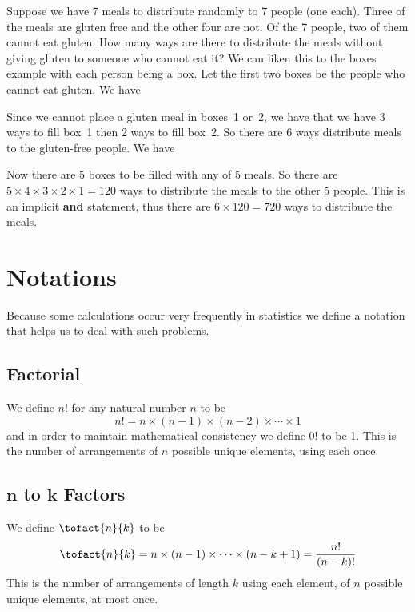 \begin{example}
Suppose we have 7 meals to distribute randomly to 7 people (one each). Three of the meals are gluten free and the other four are not. Of the 7 people, two of them cannot eat gluten. How many ways are there to distribute the meals without giving gluten to someone who cannot eat it?
\tcblower
We can liken this to the boxes example with each person being a box. Let the first two boxes be the people who cannot eat gluten. We have
\begin{center}
\end{center}
Since we cannot place a gluten meal in boxes~1 or~2, we have that we have 3 ways to fill box~1 then 2 ways to fill box~2. So there are 6 ways distribute meals to the gluten-free people. We have
\begin{center}
\end{center}
Now there are 5 boxes to be filled with any of 5 meals. So there are $5 \times 4 \times 3 \times 2 \times 1 = 120$ ways to distribute the meals to the other 5 people. This is an implicit \textbf{and} statement, thus there are $6 \times 120 = 720$ ways to distribute the meals.
\end{example}
\section{Notations}
Because some calculations occur very frequently in statistics we define a notation that helps us to deal with such problems.
\subsection*{Factorial}
We define $n!$ for any natural number $n$ to be
\[
    n! = n \times (n-1) \times (n-2) \times \cdots \times 1
\]
and in order to maintain mathematical consistency we define $0!$ to be 1. This is the number of arrangements of $n$ possible unique elements, using each once.
\subsection*{$\mathbf{n}$ to $\mathbf{k}$ Factors}
We define $\tofact{n}{k}$ to be
\[
    \tofact{n}{k} = n \times (n-1) \times \cdots \times (n-k+1) = \frac{n!}{(n-k)!}
\]
This is the number of arrangements of length $k$ using each element, of $n$ possible unique elements, at most once.
